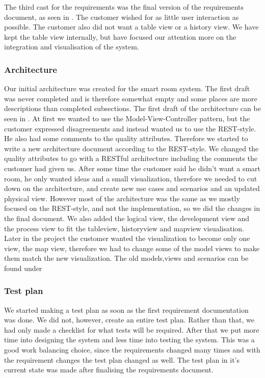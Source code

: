 \documentclass[../document.tex]{subfiles}
\begin{document}
The third cast for the requirements was the final version of the requirements document, as seen in . The customer wished for as little user interaction as possible. The customer also did not want a table view or a history view. We have kept the table view internally, but have focused our attention more on the integration and visualisation of the system.

\subsubsection{Architecture}
Our initial architecture was created for the smart room system. The first draft was never completed and is therefore somewhat empty and some places are more descriptions than completed subsections. The first draft of the architecture can be seen in . At first we wanted to use the Model-View-Controller pattern, but the customer expressed disagreements and instead wanted us to use the REST-style. He also had some comments to the quality attributes. Therefore we started to write a new architecture document according to the REST-style. We changed the quality attributes to go with a RESTful architecture including the comments the customer had given us. After some time the customer said he didn’t want a smart room, he only wanted ideas and a small visualization, therefore we needed to cut down on the architecture, and create new use cases and scenarios and an updated physical view. However most of the architecture was the same as we mostly focused on the REST-style, and not the implementation, so we did the changes in the final document. We also added the logical view, the development view and the process view to fit the tableview, historyview and mapview visualisation. Later in the project the customer wanted the visualization to become only one view, the map view, therefore we had to change some of the model views to make them match the new visualization. The old models,views and scenarios can be found under 

\subsubsection{Test plan}
We started making a test plan as soon as the first requirement documentation was done. We did not, however, create an entire test plan. Rather than that, we had only made a checklist for what tests will be required. After that we put more time into designing the system and less time into testing the system. This was a good work balancing choice, since the requirements changed many times and with the requirement changes the test plan changed as well. The test plan in it’s current state was made after finalising the requirements document.
\end{document}
